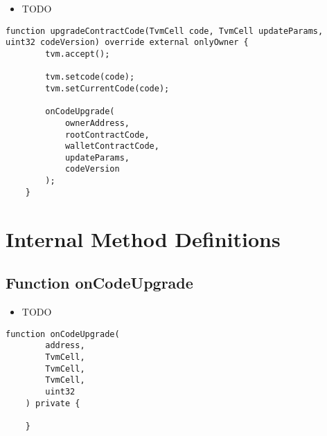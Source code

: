 \noindent\begin{itemize}
\item TODO
\end{itemize}

\begin{lstlisting}[firstnumber=33]
    function upgradeContractCode(TvmCell code, TvmCell updateParams, uint32 codeVersion) override external onlyOwner {
        tvm.accept();

        tvm.setcode(code);
        tvm.setCurrentCode(code);

        onCodeUpgrade(
            ownerAddress,
            rootContractCode,
            walletContractCode,
            updateParams,
            codeVersion
        );
    }
\end{lstlisting}

\section{Internal Method Definitions}


\subsection{Function onCodeUpgrade}

\noindent\begin{itemize}
\item TODO
\end{itemize}

\begin{lstlisting}[firstnumber=48]
    function onCodeUpgrade(
        address,
        TvmCell,
        TvmCell,
        TvmCell,
        uint32
    ) private {

    }
\end{lstlisting}

